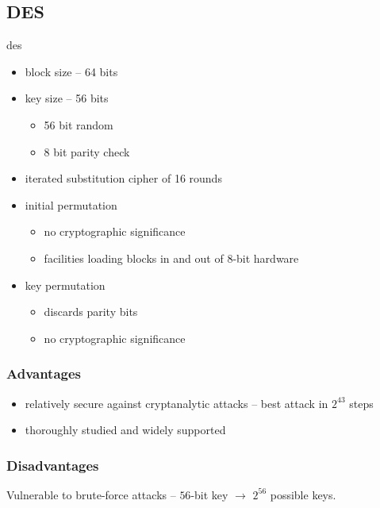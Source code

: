 \documentclass[final]{article}
\begin{document}
\subsection{DES}
\acrfull{des}
\begin{itemize}[nosep]
    \item block size -- 64 bits
    \item key size -- 56 bits
          \begin{itemize}[nosep]
              \item 56 bit random
              \item 8 bit parity check
          \end{itemize}
    \item iterated substitution cipher of 16 rounds
    \item initial permutation
          \begin{itemize}[nosep]
              \item no cryptographic significance
              \item facilities loading blocks in and out of 8-bit hardware
          \end{itemize}
    \item key permutation
          \begin{itemize}[nosep]
              \item discards parity bits
              \item no cryptographic significance
          \end{itemize}
\end{itemize}
\subsubsection*{Advantages}
\begin{itemize}[nosep]
    \item relatively secure against cryptanalytic attacks -- best attack in $2^{43}$ steps
    \item thoroughly studied and widely supported
\end{itemize}
\subsubsection*{Disadvantages}
Vulnerable to \glspl{brute-force attack} -- $56$-bit key $\rightarrow$ $2^{56}$ possible keys.
\end{document}

